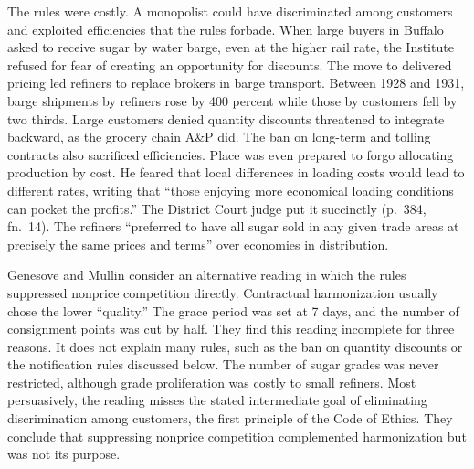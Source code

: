 The rules were costly. A monopolist could have discriminated among customers and exploited efficiencies that the
rules forbade. When large buyers in Buffalo asked to receive sugar by water barge, even at the higher rail rate,
the Institute refused for fear of creating an opportunity for discounts. The move to delivered pricing led
refiners to replace brokers in barge transport. Between 1928 and 1931, barge shipments by refiners rose by 400
percent while those by customers fell by two thirds. Large customers denied quantity discounts threatened to
integrate backward, as the grocery chain A\&P did. The ban on long-term and tolling contracts also sacrificed
efficiencies. Place was even prepared to forgo allocating production by cost. He feared that local differences in
loading costs would lead to different rates, writing that ``those enjoying more economical loading conditions
can pocket the profits.'' The District Court judge put it succinctly (p.~384, fn.~14). The refiners
``preferred to have all sugar sold in any given trade areas at precisely the same prices and terms'' over
economies in distribution.

Genesove and Mullin consider an alternative reading in which the rules suppressed nonprice competition directly.
Contractual harmonization usually chose the lower ``quality.'' The grace period was set at 7 days, and the number
of consignment points was cut by half. They find this reading incomplete for three reasons. It does not explain
many rules, such as the ban on quantity discounts or the notification rules discussed below. The number of sugar
grades was never restricted, although grade proliferation was costly to small refiners. Most persuasively, the
reading misses the stated intermediate goal of eliminating discrimination among customers, the first principle
of the Code of Ethics. They conclude that suppressing nonprice competition complemented harmonization but was
not its purpose.

